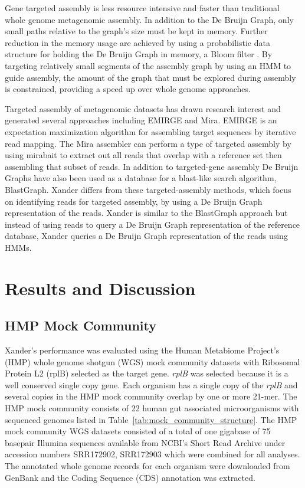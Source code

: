 \documentclass[10pt]{bmc_article}
\newenvironment{bmcformat}{\begin{raggedright}\baselineskip20pt\sloppy\setboolean{publ}{false}}{\end{raggedright}\baselineskip20pt\sloppy}
\begin{document}
\begin{bmcformat}
Gene targeted assembly is less resource intensive and faster than traditional whole genome metagenomic assembly.  In addition to the De Bruijn Graph, only small paths relative to the graph's size must be kept in memory.  Further reduction in the memory usage are achieved by using a probabilistic data structure for holding the De Bruijn Graph in memory, a Bloom filter \cite{bloom_space/time_1970,pell_scaling_2012}.  By targeting relatively small segments of the assembly graph by using an HMM to guide assembly, the amount of the graph that must be explored during assembly is constrained, providing a speed up over whole genome approaches.

Targeted assembly of metagenomic datasets has drawn research interest and generated several approaches including EMIRGE\cite{miller_emirge:_2011} and Mira\cite{chevreux_using_2004}. EMIRGE is an expectation maximization algorithm for assembling target sequences by iterative read mapping.  The Mira assembler can perform a type of targeted assembly by using mirabait to extract out all reads that overlap with a reference set then assembling that subset of reads.  In addition to targeted-gene assembly De Bruijn Graphs have also been used as a database for a blast-like search algorithm, BlastGraph\cite{holley_blastgraph:_2012}.  Xander differs from these targeted-assembly methods, which focus on identifying reads for targeted assembly, by using a De Bruijn Graph representation of the reads.  Xander is similar to the BlastGraph approach but instead of using reads to query a De Bruijn Graph representation of the reference database, Xander queries a De Bruijn Graph representation of the reads using HMMs.
\section*{Results and Discussion}
\subsection*{HMP Mock Community}
Xander's performance was evaluated using the Human Metabiome Project's (HMP) whole genome shotgun (WGS) mock community datasets with Ribosomal Protein L2 (rplB) selected as the target gene.  \emph{rplB} was selected because it is a well conserved single copy gene.  Each organism has a single copy of the \emph{rplB} and several copies in the HMP mock community overlap by one or more 21-mer. The HMP mock community consists of 22 human gut associated microorganisms with sequenced genomes listed in Table~\ref{tab:mock_community_structure}.  The HMP mock community WGS datasets consisted of a total of one gigabase of 75 basepair Illumina sequences available from NCBI's Short Read Archive under accession numbers SRR172902, SRR172903 which were combined for all analyses.  The annotated whole genome records for each organism were downloaded from GenBank and the Coding Sequence (CDS) annotation was extracted.


\end{bmcformat}
\end{document}
